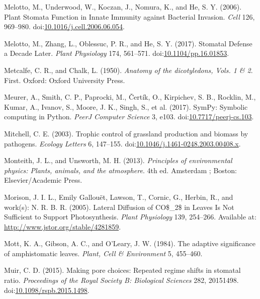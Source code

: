 \documentclass[utf8]{frontiersSCNS}
\newlength{\cslhangindent}
\newenvironment{cslreferences}%
  {\setlength{\parindent}{0pt}%
  \everypar{\setlength{\hangindent}{\cslhangindent}}\ignorespaces}%
  {\par}
\begin{document}
\begin{cslreferences}
\leavevmode\hypertarget{ref-melotto_plant_2006}{}%
Melotto, M., Underwood, W., Koczan, J., Nomura, K., and He, S. Y.
(2006). Plant Stomata Function in Innate Immunity against Bacterial
Invasion. \emph{Cell} 126, 969--980.
doi:\href{https://doi.org/10.1016/j.cell.2006.06.054}{10.1016/j.cell.2006.06.054}.

\leavevmode\hypertarget{ref-melotto_stomatal_2017}{}%
Melotto, M., Zhang, L., Oblessuc, P. R., and He, S. Y. (2017). Stomatal
Defense a Decade Later. \emph{Plant Physiology} 174, 561--571.
doi:\href{https://doi.org/10.1104/pp.16.01853}{10.1104/pp.16.01853}.

\leavevmode\hypertarget{ref-metcalfe_anatomy_1950}{}%
Metcalfe, C. R., and Chalk, L. (1950). \emph{Anatomy of the
dicotyledons, Vols. 1 \& 2}. First. Oxford: Oxford University Press.

\leavevmode\hypertarget{ref-meurer_sympy:_2017}{}%
Meurer, A., Smith, C. P., Paprocki, M., Čertík, O., Kirpichev, S. B.,
Rocklin, M., Kumar, A., Ivanov, S., Moore, J. K., Singh, S., et al.
(2017). SymPy: Symbolic computing in Python. \emph{PeerJ Computer
Science} 3, e103.
doi:\href{https://doi.org/10.7717/peerj-cs.103}{10.7717/peerj-cs.103}.

\leavevmode\hypertarget{ref-mitchell_trophic_2003}{}%
Mitchell, C. E. (2003). Trophic control of grassland production and
biomass by pathogens. \emph{Ecology Letters} 6, 147--155.
doi:\href{https://doi.org/10.1046/j.1461-0248.2003.00408.x}{10.1046/j.1461-0248.2003.00408.x}.

\leavevmode\hypertarget{ref-monteith_principles_2013}{}%
Monteith, J. L., and Unsworth, M. H. (2013). \emph{Principles of
environmental physics: Plants, animals, and the atmosphere}. 4th ed.
Amsterdam ; Boston: Elsevier/Academic Press.

\leavevmode\hypertarget{ref-morison_lateral_2005}{}%
Morison, J. I. L., Emily Gallouët, Lawson, T., Cornic, G., Herbin, R.,
and work(s): N. R. B. R. (2005). Lateral Diffusion of CO\$\_2\$ in
Leaves Is Not Sufficient to Support Photosynthesis. \emph{Plant
Physiology} 139, 254--266. Available at:
\url{http://www.jstor.org/stable/4281859}.

\leavevmode\hypertarget{ref-mott_adaptive_1984}{}%
Mott, K. A., Gibson, A. C., and O'Leary, J. W. (1984). The adaptive
significance of amphistomatic leaves. \emph{Plant, Cell \& Environment}
5, 455--460.

\leavevmode\hypertarget{ref-muir_making_2015}{}%
Muir, C. D. (2015). Making pore choices: Repeated regime shifts in
stomatal ratio. \emph{Proceedings of the Royal Society B: Biological
Sciences} 282, 20151498.
doi:\href{https://doi.org/10.1098/rspb.2015.1498}{10.1098/rspb.2015.1498}.


\end{cslreferences}
\end{document}
